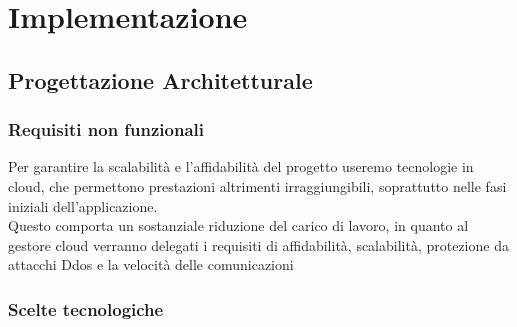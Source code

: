 \clearpage
\section{Implementazione}

\subsection{Progettazione Architetturale}

\subsubsection{Requisiti non funzionali}
Per garantire la scalabilità e l'affidabilità del progetto useremo tecnologie in cloud,
 che permettono prestazioni altrimenti irraggiungibili, soprattutto nelle fasi iniziali dell'applicazione.\\
Questo comporta un sostanziale riduzione del carico di lavoro, in quanto al gestore cloud verranno delegati i requisiti di 
affidabilità, scalabilità, protezione da attacchi Ddos e la velocità delle comunicazioni\\ 
\subsubsection{Scelte tecnologiche}

